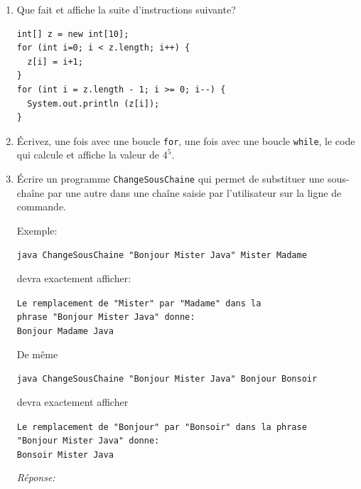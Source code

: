 \documentclass[11pt,a4paper]{article}
\begin{document}
\begin{enumerate}

  \item Que fait et affiche la suite d'instructions suivante?
  \begin{verbatim}
int[] z = new int[10];
for (int i=0; i < z.length; i++) {
  z[i] = i+1;
}
for (int i = z.length - 1; i >= 0; i--) {
  System.out.println (z[i]);
}
  \end{verbatim}

  \vspace*{4cm}

  \item Écrivez, une fois avec une boucle \texttt{for}, une fois
  avec une boucle \texttt{while}, le code qui calcule et affiche la
  valeur de $4^5$.

\pagebreak

  \item Écrire un programme \texttt{ChangeSousChaine} qui permet de
  substituer une sous-chaîne par une autre dans une chaîne saisie par
  l'utilisateur sur la ligne de commande.

  \noindent Exemple:

  \noindent \texttt{java ChangeSousChaine "Bonjour Mister Java" Mister
  Madame}

  \noindent devra exactement afficher:

  \noindent
  \texttt{Le remplacement de "Mister" par "Madame" dans la\\
  phra\-se "Bonjour Mister Java" donne:}\\
  \texttt{Bonjour Madame Java}

  \noindent De même

  \noindent \texttt{\small java ChangeSousChaine "Bonjour Mister Java"
  Bonjour Bonsoir}

  \noindent devra exactement afficher

  \noindent \texttt{Le remplacement de "Bonjour" par "Bonsoir" dans la
  phrase\\
  "Bonjour Mister Java" donne:}\\
  \texttt{Bonsoir Mister Java}

  \noindent \emph{Réponse:}


\end{enumerate}
\end{document}
